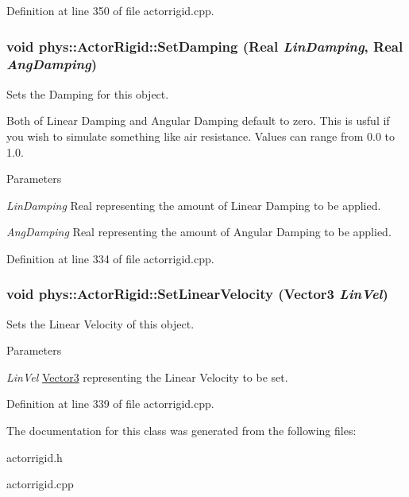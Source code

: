 Definition at line 350 of file actorrigid.cpp.

\hypertarget{classphys_1_1ActorRigid_a228fc92e7db56d07e441e6812ac28288}{
\subsubsection[{SetDamping}]{\setlength{\rightskip}{0pt plus 5cm}void phys::ActorRigid::SetDamping ({\bf Real} {\em LinDamping}, \/  {\bf Real} {\em AngDamping})}}
\label{d8/d71/classphys_1_1ActorRigid_a228fc92e7db56d07e441e6812ac28288}


Sets the Damping for this object. 

Both of Linear Damping and Angular Damping default to zero. This is usful if you wish to simulate something like air resistance. Values can range from 0.0 to 1.0. 
\begin{DoxyParams}{Parameters}
\item[{\em LinDamping}]Real representing the amount of Linear Damping to be applied. \item[{\em AngDamping}]Real representing the amount of Angular Damping to be applied. \end{DoxyParams}


Definition at line 334 of file actorrigid.cpp.

\hypertarget{classphys_1_1ActorRigid_a2b25eed4dcd594796c35a549d1c87559}{
\subsubsection[{SetLinearVelocity}]{\setlength{\rightskip}{0pt plus 5cm}void phys::ActorRigid::SetLinearVelocity ({\bf Vector3} {\em LinVel})}}
\label{d8/d71/classphys_1_1ActorRigid_a2b25eed4dcd594796c35a549d1c87559}


Sets the Linear Velocity of this object. 


\begin{DoxyParams}{Parameters}
\item[{\em LinVel}]\hyperlink{classphys_1_1Vector3}{Vector3} representing the Linear Velocity to be set. \end{DoxyParams}


Definition at line 339 of file actorrigid.cpp.



The documentation for this class was generated from the following files:\begin{DoxyCompactItemize}
\item 
actorrigid.h\item 
actorrigid.cpp\end{DoxyCompactItemize}
